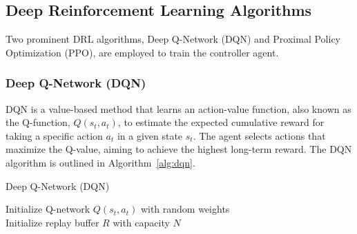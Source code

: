 \documentclass[11pt,a4paper]{article}
\begin{document}
\subsection{Deep Reinforcement Learning Algorithms}
Two prominent DRL algorithms, Deep Q-Network (DQN) and Proximal Policy Optimization (PPO), are employed to train the controller agent.

\subsubsection{Deep Q-Network (DQN)}
DQN is a value-based method that learns an action-value function, also known as the Q-function, $Q(s_t, a_t)$,  to estimate the expected cumulative reward for taking a specific action $a_t$ in a given state $s_t$. The agent selects actions that maximize the Q-value, aiming to achieve the highest long-term reward. The DQN algorithm is outlined in Algorithm~\ref{alg:dqn}.

\begin{algorithm}[t]
\SetAlgoLined
\caption{Deep Q-Network (DQN)}\label{alg:dqn}
Initialize Q-network $Q(s_t, a_t)$ with random weights\\
Initialize replay buffer $R$ with capacity $N$\\
\end{algorithm}
\end{document}
